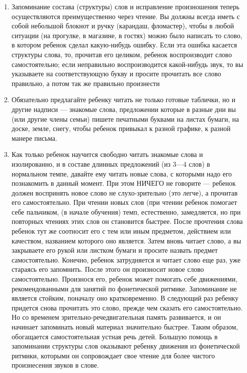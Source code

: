 \documentclass{book}
\begin{document}
\begin{enumerate}
\def\labelenumi{\arabic{enumi}.}
\setcounter{enumi}{1}
\item
  
  Запоминание состава (структуры) слов и исправление произношения теперь
  осуществляются преимущественно через чтение. Вы должны всегда иметь с
  собой небольшой блокнот и ручку (карандаш, фломастер), чтобы в любой
  ситуации (на прогулке, в магазине, в гостях) можно было написать то
  слово, в котором ребенок сделал какую-нибудь ошибку. Если эта ошибка
  касается структуры слова, то, прочитав его целиком, ребенок
  воспроизводит слово самостоятельно; если неправильно воспроизводится
  какой-нибудь звук, то вы указываете на соответствующую букву и просите
  прочитать все слово правильно, а потом так же правильно произнести
  
\item
  
  Обязательно предлагайте ребенку читать не только готовые таблички, но
  и другие надписи --- знакомые слова, предложении которые в разные дни
  вы (или другие члены семьи) пишете печатными буквами на листах бумаги,
  на доске, земле, снегу, чтобы ребенок привыкал к разной графике, к
  разной манере письма.
  
\item
  
  Как только ребенок научится свободно читать знакомые слова и
  изолированно, и в составе длинных предложений (из 3---4 слов) в
  нормальном темпе, давайте ему читать новые слова, с которыми надо его
  познакомить в данный момент. При этом НИЧЕГО не говорите --- ребенок
  должен воспринять новое слово не слухо-зрительно (это легче), а
  прочитав его самостоятельно. При чтении новых слов (при чтении ребенок
  помогает себе пальчиком, (в начале обучения) темп, естественно,
  замедляется, но при повторных чтениях этих слов он становится быстрее.
  После прочтения слова ребенок тут же соотносит его с тем или иным
  предметом, действием или качеством, названием которого оно является.
  Затем вновь читает слово, а вы закрываете его рукой или листком бумаги
  и просите назвать предмет самостоятельно. Конечно, ребенок
  затрудняется и читает слово еще раз, уже стараясь его запомнить. После
  этого он произносит новое слово самостоятельно. Произнося его, ребенок
  может помогать себе движениями, рекомендованными для занятий по
  фонетической ритмике. Запоминание не является стойким, поначалу оно
  кратковременно. В следующий раз ребенку придется снова прочитать это
  слово, прежде чем сказать его самостоятельно. Но со временем
  зрительно-речедвигательная память развивается, и он начинает
  запоминать новый материал значительно быстрее. Таким образом,
  обогащается самостоятельная устная речь детей. Большую помощь в
  запоминании структуры слов оказывают ребенку движения из фонетической
  ритмики, которыми он сопровождает свое чтение для более чистого
  произнесения звуков в слове.
  
\end{enumerate}
\end{document}
